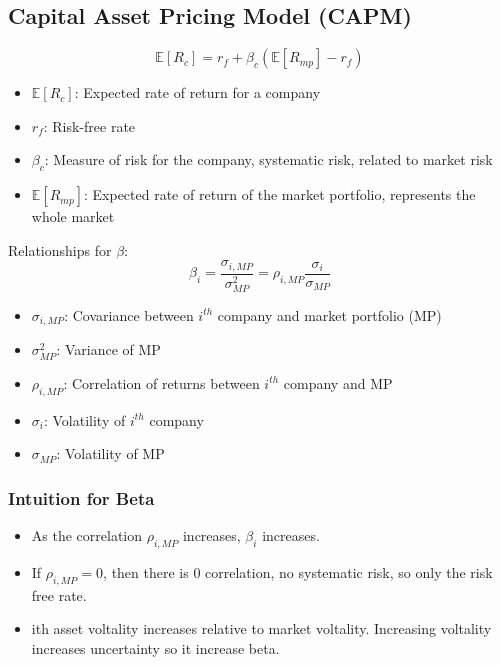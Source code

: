 \subsection{Capital Asset Pricing Model (CAPM)}
\begin{definition}
    \begin{equation}
        \mathbb{E}[R_c] = r_f + \beta_c \left(\mathbb{E}[R_{mp}] - r_f\right)
    \end{equation}
        
    \begin{itemize}
        \item $\mathbb{E}[R_c]$: Expected rate of return for a company
        \item $r_f$: Risk-free rate
        \item $\beta_c$: Measure of risk for the company, systematic risk, related to market risk
        \item $\mathbb{E}[R_{mp}]$: Expected rate of return of the market portfolio, represents the whole market
    \end{itemize}

    \vspace{1em}

    Relationships for $\beta$:
    \begin{equation}
        \beta_i = \frac{\sigma_{i, MP}}{\sigma^2_{MP}} = \rho_{i, MP} \frac{\sigma_i}{\sigma_{MP}}
    \end{equation}
    
    \begin{itemize}
        \item $\sigma_{i, MP}$: Covariance between $i^{th}$ company and market portfolio (MP)
        \item $\sigma^2_{MP}$: Variance of MP
        \item $\rho_{i, MP}$: Correlation of returns between $i^{th}$ company and MP
        \item $\sigma_i$: Volatility of $i^{th}$ company
        \item $\sigma_{MP}$: Volatility of MP
    \end{itemize}

\end{definition}

    \subsubsection{Intuition for Beta}
    \begin{intuition}
        \begin{itemize}
            \item As the correlation $\rho_{i, MP}$ increases, $\beta_i$ increases.
            \item If $\rho_{i, MP}=0$, then there is 0 correlation, no systematic risk, so only the risk free rate. 
            \item ith asset voltality increases relative to market voltality. Increasing voltality increases uncertainty so it increase beta. 
        \end{itemize}
    \end{intuition}

